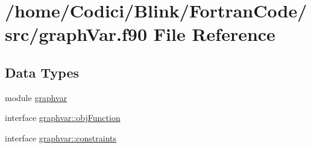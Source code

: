 \hypertarget{graph_var_8f90}{\section{/home/\-Codici/\-Blink/\-Fortran\-Code/src/graph\-Var.f90 File Reference}
\label{graph_var_8f90}
}
\subsection*{Data Types}
\begin{DoxyCompactItemize}
\item 
module \hyperlink{classgraphvar}{graphvar}
\item 
interface \hyperlink{interfacegraphvar_1_1obj_function}{graphvar\-::obj\-Function}
\item 
interface \hyperlink{interfacegraphvar_1_1constraints}{graphvar\-::constraints}
\end{DoxyCompactItemize}
